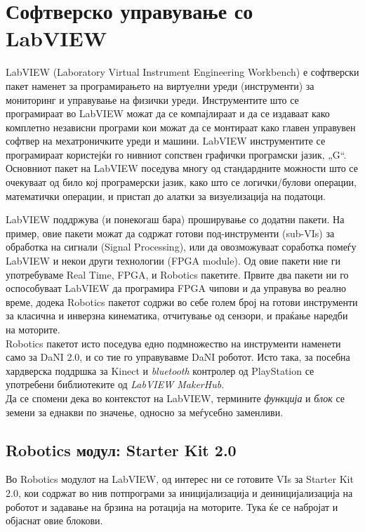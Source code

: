 \documentclass[12pt]{article}
\begin{document}
\newpage

\section{Софтверско управување со LabVIEW}
  LabVIEW (Laboratory Virtual Instrument Engineering Workbench) е софтверски пакет наменет за програмирањето на виртуелни уреди (инструменти) за мониторинг и управување на физички уреди. Инструментите што се програмираат во LabVIEW можат да се компајлираат и да се издаваат како комплетно независни програми кои можат да се монтираат како главен управувен софтвер на мехатроничките уреди и машини. LabVIEW инструментите се програмираат користејќи го нивниот сопствен графички програмски јазик, „G“.
  \\
  Основниот пакет на LabVIEW поседува многу од стандардните можности што се очекуваат од било кој програмерски јазик, како што се логички/булови операции, математички операции, и пристап до алатки за визуелизација на податоци.

  LabVIEW поддржува (и понекогаш бара) проширување со додатни пакети. На пример, овие пакети можат да содржат готови под-инструменти (sub-VIs) за обработка на сигнали (Signal Processing), или да овозможуваат соработка помеѓу LabVIEW и некои други технологии (FPGA module). Од овие пакети ние ги употребуваме Real Time, FPGA, и Robotics пакетите. Првите два пакети ни го оспособуваат LabVIEW да програмира FPGA чипови и да управува во реално време, додека Robotics пакетот содржи во себе голем број на готови инструменти за класична и инверзна кинематика, отчитување од сензори, и праќање наредби на моторите.
  \\
  Robotics пакетот исто поседува едно подмножество на инструменти наменети само за DaNI 2.0, и со тие го управувавме DaNI роботот. Исто така, за посебна хардверска поддршка за Kinect и \textit{bluetooth} контролер од PlayStation се употребени библиотеките од \textit{LabVIEW MakerHub}.
  \\
  Да се спомени дека во контекстот на LabVIEW, термините \textit{функција} и \textit{блок} се земени за еднакви по значење, односно за меѓусебно заменливи.

  \subsection{Robotics модул: Starter Kit 2.0}
    Во Robotics модулот на LabVIEW, од интерес ни се готовите VIs за Starter Kit 2.0, кои содржат во нив потпрограми за иницијализација и деиницијализација на роботот и задавање на брзина на ротација на моторите. Тука ќе се набројат и објаснат овие блокови.
\end{document}
